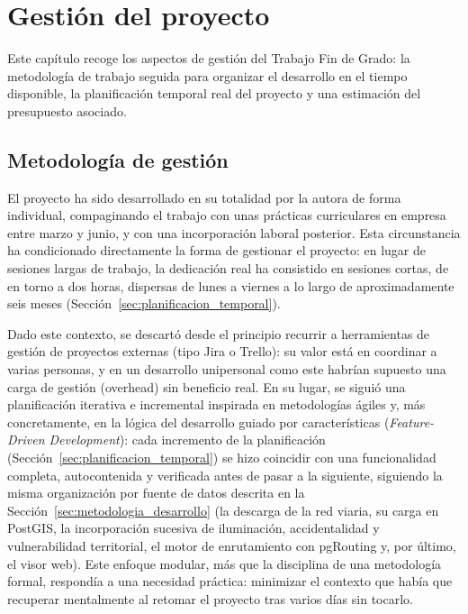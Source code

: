 \chapter{Gestión del proyecto}
\label{cap:gestion}

Este capítulo recoge los aspectos de gestión del Trabajo Fin de Grado: la metodología de trabajo seguida para organizar el desarrollo en el tiempo disponible, la planificación temporal real del proyecto y una estimación del presupuesto asociado.

\section{Metodología de gestión}
\label{sec:metodologia_gestion}

El proyecto ha sido desarrollado en su totalidad por la autora de forma individual, compaginando el trabajo con unas prácticas curriculares en empresa entre marzo y junio, y con una incorporación laboral posterior. Esta circunstancia ha condicionado directamente la forma de gestionar el proyecto: en lugar de sesiones largas de trabajo, la dedicación real ha consistido en sesiones cortas, de en torno a dos horas, dispersas de lunes a viernes a lo largo de aproximadamente seis meses (Sección~\ref{sec:planificacion_temporal}).

Dado este contexto, se descartó desde el principio recurrir a herramientas de gestión de proyectos externas (tipo Jira o Trello): su valor está en coordinar a varias personas, y en un desarrollo unipersonal como este habrían supuesto una carga de gestión (overhead) sin beneficio real. En su lugar, se siguió una planificación iterativa e incremental inspirada en metodologías ágiles y, más concretamente, en la lógica del desarrollo guiado por características (\textit{Feature-Driven Development}): cada incremento de la planificación (Sección~\ref{sec:planificacion_temporal}) se hizo coincidir con una funcionalidad completa, autocontenida y verificada antes de pasar a la siguiente, siguiendo la misma organización por fuente de datos descrita en la Sección~\ref{sec:metodologia_desarrollo} (la descarga de la red viaria, su carga en PostGIS, la incorporación sucesiva de iluminación, accidentalidad y vulnerabilidad territorial, el motor de enrutamiento con pgRouting y, por último, el visor web). Este enfoque modular, más que la disciplina de una metodología formal, respondía a una necesidad práctica: minimizar el contexto que había que recuperar mentalmente al retomar el proyecto tras varios días sin tocarlo.

